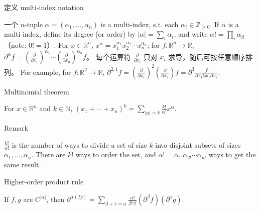 \begin{definition}{定义 multi-index notation}

一个 \(n\)-tuple \(\alpha = \left( {\alpha_{1},\ldots,\alpha_{n}} \right)\) is a multi-index, s.t. each \(\alpha_{i} \in \mathbb{Z}_{\geq 0}\). If \(\alpha\) is a multi-index, define its degree (or order) by \(|\alpha| = \sum_{i}\alpha_{i}\), and write \(\alpha! = \prod_{i}\alpha_{i!}\)（note: \(0! = 1\)）. For \(x \in \mathbb{R}^{n}\), \(x^{\alpha} = x_{1}^{\alpha_{1}}x_{2}^{\alpha_{2}}\cdots x_{n}^{\alpha_{n}}\); for \(f:\mathbb{R}^{n}\rightarrow\mathbb{R}\), \(\partial^{\alpha}f = \left( \frac{\partial}{\partial x_{1}} \right)^{\alpha_{1}}\cdots\left( \frac{\partial}{\partial x_{n}} \right)^{\alpha_{n}}f\)。 每个运算符 \(\frac{\partial}{\partial x_{i}}\) 只对 \(x_{i}\) 求导，随后可按任意顺序排列。 For example, for \(f:\mathbb{R}^{2}\rightarrow\mathbb{R}\), \(\partial^{2,1}f = \left( \frac{\partial}{\partial x_{1}} \right)^{2}\left( \frac{\partial}{\partial x_{2}} \right)f = \partial^{3}\frac{f}{\partial x_{1}\partial x_{1}\partial x_{2}}\).

\end{definition}

\begin{theorem}{Multinomial theorem}

For \(x \in \mathbb{R}^{n}\) and \(k \in \mathbb{N}\), \(\left( {x_{1} + \cdots + x_{n}} \right)^{k} = \sum_{{|\alpha|} = k}\frac{k!}{\alpha!}x^{\alpha}\).

\end{theorem}

\begin{qlremark}{Remark}

\(\frac{k!}{\alpha!}\) is the number of ways to divide a set of size \(k\) into disjoint subsets of sizes \(\alpha_{1},\ldots,\alpha_{n}\). There are \(k!\) ways to order the set, and \(\alpha! = \alpha_{1!}\alpha_{2!}\cdots\alpha_{n!}\) ways to get the same result.

\end{qlremark}

\begin{theorem}{Higher-order product rule}

If \(f,g\) are \(C^{|\alpha|}\), then \(\partial^{\alpha{({fg})}} = \sum_{\beta + \gamma = \alpha}\frac{\alpha!}{\beta!\gamma!}\left( {\partial^{\beta}f} \right)\left( {\partial^{\gamma}g} \right)\).

\end{theorem}

